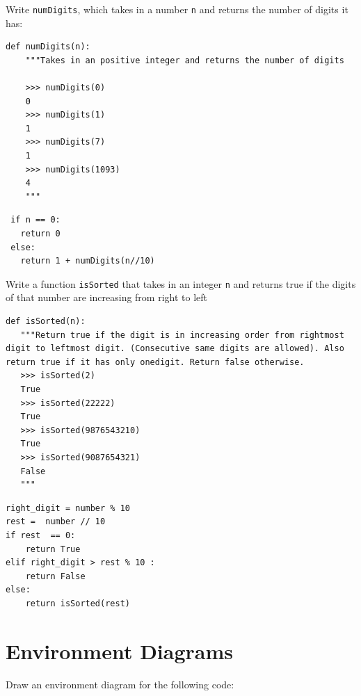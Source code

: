 \documentclass{exam}
\begin{document}
\begin{questions}


\begin{blocksection}
\question Write \texttt{numDigits}, which takes in a number \texttt{n} and returns the number of digits it has:

\begin{lstlisting}
def numDigits(n):
    """Takes in an positive integer and returns the number of digits

    >>> numDigits(0)
    0
    >>> numDigits(1)
    1
    >>> numDigits(7)
    1
    >>> numDigits(1093)
    4
    """
\end{lstlisting}

\begin{solution}[1in]
\begin{lstlisting}
 if n == 0:
   return 0
 else:
   return 1 + numDigits(n//10)
\end{lstlisting}
\end{solution}

\end{blocksection}



\begin{blocksection}
\question Write a function \texttt{isSorted} that takes in an integer \texttt{n} and returns true if the digits of that number are increasing from right to left

\begin{lstlisting}
def isSorted(n): 
   """Return true if the digit is in increasing order from rightmost digit to leftmost digit. (Consecutive same digits are allowed). Also return true if it has only onedigit. Return false otherwise.
   >>> isSorted(2)
   True
   >>> isSorted(22222)
   True
   >>> isSorted(9876543210)
   True
   >>> isSorted(9087654321)
   False
   """
\end{lstlisting}

\begin{solution}[1in]
\begin{lstlisting}
right_digit = number % 10
rest =  number // 10
if rest  == 0:
    return True
elif right_digit > rest % 10 :
    return False
else:
  	return isSorted(rest) 
\end{lstlisting}
\end{solution}

\end{blocksection}

\section{Environment Diagrams}
\begin{blocksection}
\question Draw an environment diagram for the following code:


\end{blocksection}
\end{questions}
\end{document}
